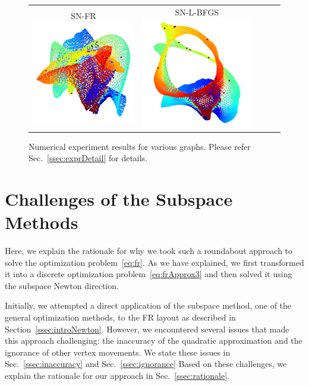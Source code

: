 \documentclass[dvipdfmx,journal]{IEEEtran}
\begin{document}
\begin{figure}[btp]
\begin{tabular}{ccccc}
        \makecell{\small{\textsf{SN-FR}}                                                                                \\[-0.2em]\includegraphics[width=0.27\columnwidth]{individual/viz/3elt_SN_FR.pdf}} &
        \makecell{\small{\textsf{SN-L-BFGS}}                                                                            \\[-0.2em]\includegraphics[width=0.27\columnwidth]{individual/viz/3elt_SN_L_BFGS.pdf}} \\
    \end{tabular}
    \caption{Numerical experiment results for various graphs.  Please refer Sec.~\ref{ssec:exprDetail} for details.}
    \label{fig:individual}
\end{figure}

\section{Challenges of the Subspace Methods}\label{sec:challenges}

Here, we explain the rationale for why we took such a roundabout approach to solve the optimization problem~\eqref{eq:fr}.
As we have explained, we first transformed it into a discrete optimization problem~\eqref{eq:frApprox3} and then solved it using the subspace Newton direction.

Initially, we attempted a direct application of the subspace method, one of the general optimization methods, to the FR layout as described in Section~\ref{ssec:introNewton}.
However, we encountered several issues that made this approach challenging: the inaccuracy of the quadratic approximation and the ignorance of other vertex movements. We state these issues in Sec.~\ref{ssec:inaccuracy} and Sec.~\ref{ssec:ignorance}
Based on these challenges, we explain the rationale for our approach in Sec.~\ref{ssec:rationale}.
\end{document}
